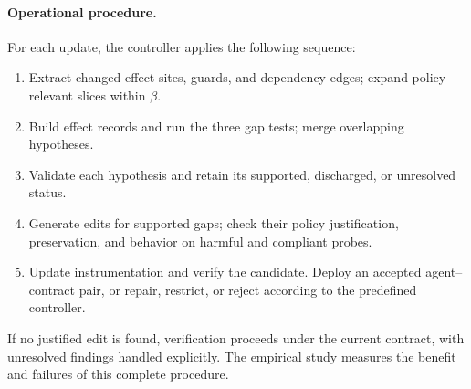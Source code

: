 \paragraph{Operational procedure.}
For each update, the controller applies the following sequence:
\begin{enumerate}[leftmargin=*]
\item Extract changed effect sites, guards, and dependency edges; expand policy-relevant slices within \(\beta\).
\item Build effect records and run the three gap tests; merge overlapping hypotheses.
\item Validate each hypothesis and retain its supported, discharged, or unresolved status.
\item Generate edits for supported gaps; check their policy justification, preservation, and behavior on harmful and compliant probes.
\item Update instrumentation and verify the candidate. Deploy an accepted agent--contract pair, or repair, restrict, or reject according to the predefined controller.
\end{enumerate}
If no justified edit is found, verification proceeds under the current contract, with unresolved findings handled explicitly. The empirical study measures the benefit and failures of this complete procedure.
